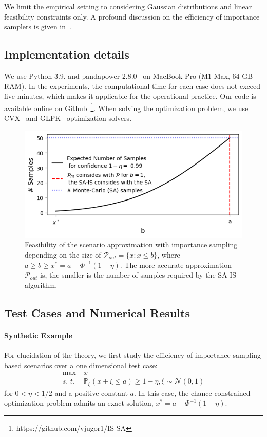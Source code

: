 We limit the empirical setting to considering Gaussian distributions and linear feasibility constraints only.
A profound discussion on the efficiency of importance samplers is given in~\cite{lukashevich2021power}.
\subsection{Implementation details} We use Python 3.9. and pandapower 2.8.0~\cite{thurner2018pandapower} on MacBook Pro (M1 Max, 64 GB RAM). In the experiments, the computational time for each case does not exceed five minutes, which makes it applicable for the operational practice. Our code is available online on Github~\footnote{https://github.com/vjugor1/IS-SA}. When solving the optimization problem, we use CVX~\cite{diamond2016cvxpy} and GLPK~\cite{GLPK} optimization solvers. 
\begin{figure}[!t]
  \centering
  \includegraphics[width=.85\textwidth]{Dissertation/images/dc_stochastic_approx/figure120.png}
  \caption{
  Feasibility of the scenario approximation with importance sampling depending on the size of $\mathcal{P}_{out}= \{x: x\le b\}$, where $a \geq b\geq x^* =a - \Phi^{-1}(1-\eta)$. The more accurate approximation $\mathcal{P}_{out}$ is, the smaller is the number of samples required by the SA-IS algorithm.}
  \label{fig:80-dc}
  
\end{figure}

\subsection{Test Cases and Numerical Results}
\paragraph{Synthetic Example}
For elucidation of the theory, we first study the efficiency of importance sampling based scenarios over a one dimensional test case:
\begin{align*}
  \max\; & x\\
  \textit{s. t. } & \mathbb{P}_\xi(x+\xi \le a) \ge 1-\eta, \xi\sim \mathcal{N}(0,1)
\end{align*}
for $0 < \eta < 1/2$ and a positive constant $a$. In this case, the chance-constrained optimization problem admits an exact solution, $x^* = a - \Phi^{-1}(1-\eta)$. 

